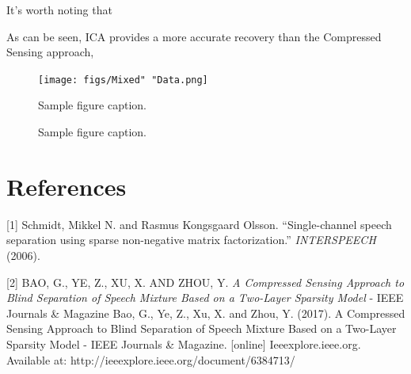 \documentclass{article}
\begin{document}
It's worth noting that

As can be seen, ICA provides a more accurate recovery than the Compressed Sensing approach, 

\begin{figure}[H]
  \centering
  \texttt{[image: figs/Mixed" "Data.png]}
  \caption{Sample figure caption.}
\end{figure}

\begin{figure}[H]
  \centering
  \caption{Sample figure caption.}
\end{figure}

\section*{References}

\medskip

\small

[1] Schmidt, Mikkel N. and Rasmus Kongsgaard Olsson. “Single-channel speech separation using sparse non-negative matrix factorization.” {\it INTERSPEECH} (2006).

[2] BAO, G., YE, Z., XU, X. AND ZHOU, Y.
{\it A Compressed Sensing Approach to Blind Separation of Speech Mixture Based on a Two-Layer Sparsity Model} - IEEE Journals \& Magazine Bao, G., Ye, Z., Xu, X. and Zhou, Y. (2017). A Compressed Sensing Approach to Blind Separation of Speech Mixture Based on a Two-Layer Sparsity Model - IEEE Journals \& Magazine. [online] Ieeexplore.ieee.org. Available at: http://ieeexplore.ieee.org/document/6384713/
\end{document}
